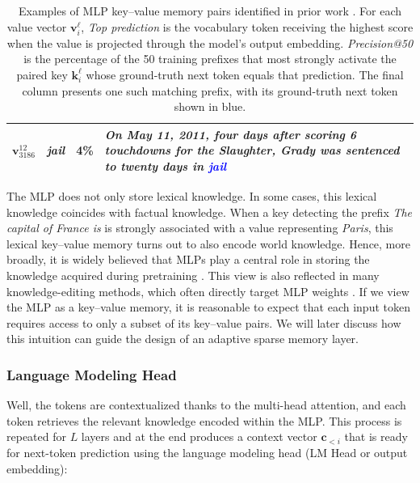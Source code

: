 \begin{table}[t]
\begin{tabularx}{\textwidth}{@{} l l c >{\raggedright\arraybackslash}X @{}}
        \midrule

        $\mathbf{v}^{12}_{3186}$
        & \emph{jail}
        & 4\%
        & \emph{On May 11, 2011, four days after scoring 6 touchdowns for the
        Slaughter, Grady was sentenced to twenty days in
        \textcolor{blue}{jail}} \\

        \bottomrule
    \end{tabularx}

    \caption{
    Examples of MLP key--value memory pairs identified in prior work
    \citep{geva-etal-2021-transformer}.
    For each value vector $\mathbf{v}^{\ell}_{i}$, \emph{Top prediction}
    is the vocabulary token receiving the highest score when the value is
    projected through the model's output embedding.
    \emph{Precision@50} is the percentage of the 50 training prefixes that
    most strongly activate the paired key $\mathbf{k}^{\ell}_{i}$ whose
    ground-truth next token equals that prediction.
    The final column presents one such matching prefix, with its
    ground-truth next token shown in blue.
    }
    \label{tab:ffn-key-value-examples}
\end{table}
The MLP does not only store lexical knowledge. In some cases, this lexical knowledge coincides
with factual knowledge. When a key detecting the prefix \textit{The capital of France is} 
is strongly associated with a value representing \textit{Paris}, this lexical key--value memory 
turns out to also encode world knowledge. 
Hence, more broadly, it is widely believed that MLPs play a central role in storing the knowledge acquired during pretraining
\citep{geva-etal-2021-transformer,dai-etal-2022-knowledge}.
This view is also reflected in many knowledge-editing methods, which often directly target MLP weights
\citep{meng2023locatingeditingfactualassociations,meng2023masseditingmemorytransformer, fang2025alphaeditnullspaceconstrainedknowledge}.
If we view the MLP as a key--value memory, it is reasonable to expect that each input token 
requires access to only a subset of its key--value pairs. We will later discuss how this 
intuition can guide the design of an adaptive sparse memory layer.

\subsubsection{Language Modeling Head}
Well, the tokens are contextualized thanks to the multi-head attention, and each token retrieves 
the relevant knowledge encoded within the MLP. This process is repeated for $L$ layers and at the end
produces a context vector $\textbf{c}_{<i}$ that is ready for next-token prediction
using the language modeling head (LM Head or output embedding):

